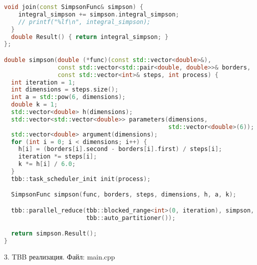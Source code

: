 \documentclass{report}
\begin{document}
\begin{lstlisting}[language=C++]
  void join(const SimpsonFunc& simpson) {
    integral_simpson += simpson.integral_simpson;
    // printf("%lf\n", integral_simpson);
  }
  double Result() { return integral_simpson; }
};

double simpson(double (*func)(const std::vector<double>&),
               const std::vector<std::pair<double, double>>& borders,
               const std::vector<int>& steps, int process) {
  int iteration = 1;
  int dimensions = steps.size();
  int a = std::pow(6, dimensions);
  double k = 1;
  std::vector<double> h(dimensions);
  std::vector<std::vector<double>> parameters(dimensions,
                                              std::vector<double>(6));
  std::vector<double> argument(dimensions);
  for (int i = 0; i < dimensions; i++) {
    h[i] = (borders[i].second - borders[i].first) / steps[i];
    iteration *= steps[i];
    k *= h[i] / 6.0;
  }
  tbb::task_scheduler_init init(process);

  SimpsonFunc simpson(func, borders, steps, dimensions, h, a, k);

  tbb::parallel_reduce(tbb::blocked_range<int>(0, iteration), simpson,
                       tbb::auto_partitioner());

  return simpson.Result();
}
\end{lstlisting}

\par 3. TBB реализация. Файл: main.cpp
\end{document}

